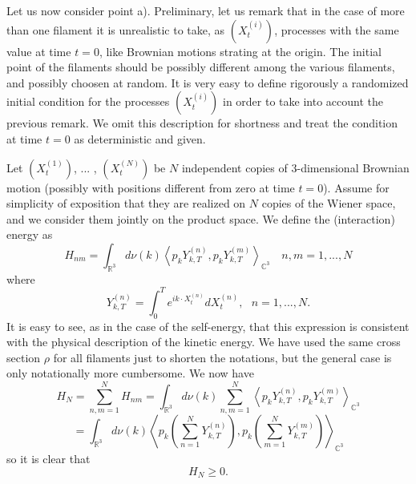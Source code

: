 Let us now consider point a). 
Preliminary, let us remark that in the case of more than one filament
it is unrealistic to take, as $(X_{t}^{\left( i\right) })$, processes with
the same value at time $t=0$, like Brownian motions strating at the origin. 
The initial point of the filaments should be
possibly different among the various filaments, and possibly choosen at
random. It is very easy to define rigorously a randomized initial condition
for the processes $(X_{t}^{\left( i\right) })$ in order to take into account
the previous remark. We omit this description for shortness and treat the
condition at time $t=0$ as deterministic and given. 

Let $(X_{t}^{\left( 1\right) })$, ... , $(X_{t}^{\left( N\right) })$ be $N$
independent copies of 3-dimensional Brownian motion (possibly with positions
different from zero at time $t=0$). Assume for simplicity of exposition that
they are realized on $N$ copies of the Wiener space, and we consider them
jointly on the product space. We define the (interaction) energy as
\begin{equation*}
H_{nm}=\int_{\mathbb{R}^{3}}d\nu \left( k\right)  \left\langle
p_{k}Y_{k,T}^{\left( n\right) },p_{k}Y_{k,T}^{\left( m\right)
  }\right\rangle_{\mathbb{C}^{3}}
\,\,\,\,\,\,n,m=1,...,N
\end{equation*}
where 
\begin{equation*}
Y_{k,T}^{\left( n\right) }=\int_{0}^{T}e^{ik\cdot X_{t}^{\left( n\right)
}}dX_{t}^{\left( n\right) },\,\,\,\,n=1,...,N.
\end{equation*}
It is easy to see, as in the case of the self-energy, that this expression
is consistent with the physical description of the kinetic energy. We have
used the same cross section $\rho $ for all filaments just to shorten the
notations, but the general case is only notationally more cumbersome. We now
have
\begin{equation*}
H_{N}=\sum_{n,m=1}^{N}H_{nm}=\int_{\mathbb{R}^{3}}d\nu \left( k\right)
\sum_{n,m=1}^{N}\left\langle p_{k}Y_{k,T}^{\left( n\right)
},p_{k}Y_{k,T}^{\left( m\right) }\right\rangle _{\mathbb{C}%
^{3}}
\end{equation*}
\begin{equation*}
=\int_{\mathbb{R}^{3}}d\nu \left( k\right) \left\langle 
p_{k}\left( \sum_{n=1}^{N}Y_{k,T}^{\left( n\right) }\right) ,p_{k}\left(
\sum_{m=1}^{N}Y_{k,T}^{\left( m\right) }\right) \right\rangle
_{\mathbb{C}^{3}}
\end{equation*}
so it is clear that 
\begin{equation*}
H_{N}\geq 0.
\end{equation*}
